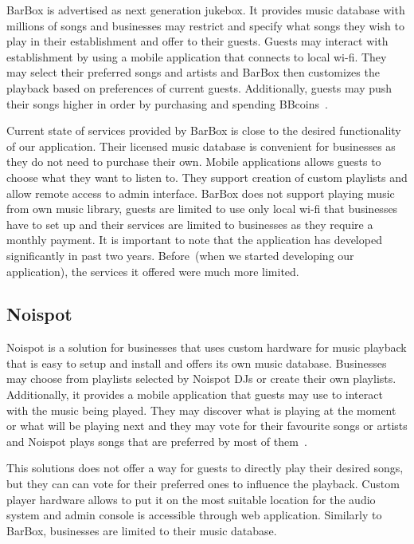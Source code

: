 BarBox is advertised as next generation jukebox. It provides music database with millions of songs and businesses may restrict and specify what songs they wish to play in their establishment and offer to their guests. Guests may interact with establishment by using a mobile application that connects to local wi-fi. They may select their preferred songs and artists and BarBox then customizes the playback based on preferences of current guests. Additionally, guests may push their songs higher in order by purchasing and spending BBcoins~\citep{barbox}.
\par
Current state of services provided by BarBox is close to the desired functionality of our application. Their licensed music database is convenient for businesses as they do not need to purchase their own. Mobile applications allows guests to choose what they want to listen to. They support creation of custom playlists and allow remote access to admin interface. BarBox does not support playing music from own music library, guests are limited to use only local wi-fi that businesses have to set up and their services are limited to businesses as they require a monthly payment. It is important to note that the application has developed significantly in past two years. Before~(when we started developing our application), the services it offered were much more limited.

\subsection{Noispot}

Noispot is a solution for businesses that uses custom hardware for music playback that is easy to setup and install and offers its own music database. Businesses may choose from playlists selected by Noispot DJs or create their own playlists. Additionally, it provides a mobile application that guests may use to interact with the music being played. They may discover what is playing at the moment or what will be playing next and they may vote for their favourite songs or artists and Noispot plays songs that are preferred by most of them~\citep{noispot}.
\par
This solutions does not offer a way for guests to directly play their desired songs, but they can can vote for their preferred ones to influence the playback. Custom player hardware allows to put it on the most suitable location for the audio system and admin console is accessible through web application. Similarly to BarBox, businesses are limited to their music database.

